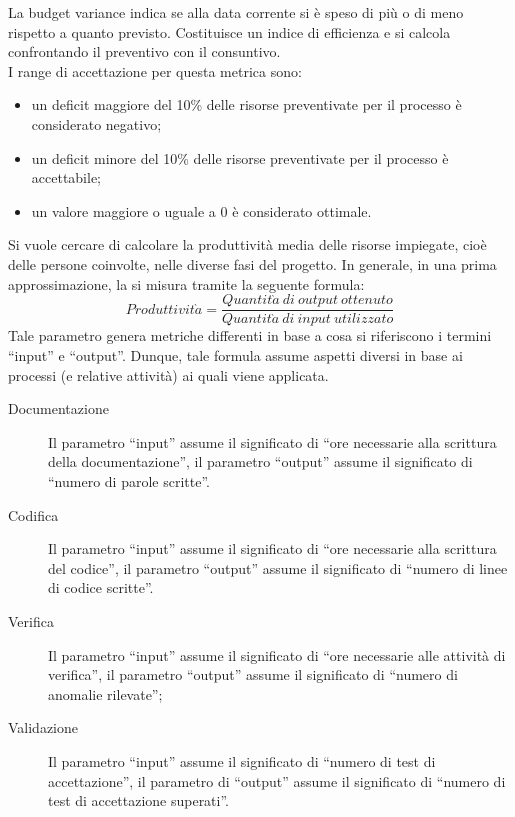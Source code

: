 				 \label{subsec:budgetVariance}
					La budget variance indica se alla data corrente si è speso di più o di meno rispetto a quanto previsto. Costituisce un indice di efficienza e si calcola confrontando il preventivo con il consuntivo.\\
					I range di accettazione per questa metrica sono:
					\begin{itemize}
						\item un deficit maggiore del 10\% delle risorse preventivate per il processo è considerato negativo;
						\item un deficit minore del 10\% delle risorse preventivate per il processo è accettabile;
						\item un valore maggiore o uguale a 0 è considerato ottimale.
					\end{itemize}
			 \label{subsec:produttivita}
				Si vuole cercare di calcolare la produttività media delle risorse impiegate, cioè delle persone coinvolte, nelle diverse fasi del progetto. In generale, in una prima approssimazione, la si misura tramite la seguente formula:
				\begin{equation} \label{eq:produttivita}						
					Produttivit\grave{a} = \frac{Quantit\grave{a}\ di\ output\ ottenuto}{Quantit\grave{a}\ di\ input\ utilizzato}
				\end{equation}
				Tale parametro genera metriche differenti in base a cosa si riferiscono i termini “input” e “output”. Dunque, tale formula assume 
				aspetti diversi in base ai processi (e relative attività) ai quali viene applicata.
				\begin{description}
					\item[Documentazione] Il parametro “input” assume il significato di “ore necessarie alla scrittura della documentazione”, il parametro “output” assume il significato di “numero di parole scritte”.
					\item[Codifica] Il parametro “input” assume il significato di “ore necessarie alla scrittura del codice”, il parametro “output” assume il significato di “numero di linee di codice scritte”.
					\item[Verifica] Il parametro “input” assume il significato di “ore necessarie alle attività di verifica”, il parametro “output” assume il significato di “numero di anomalie rilevate”;
					\item[Validazione] Il parametro “input” assume il significato di “numero di test di accettazione”, il parametro di “output” assume il significato di “numero di test di accettazione superati”.
				\end{description}
